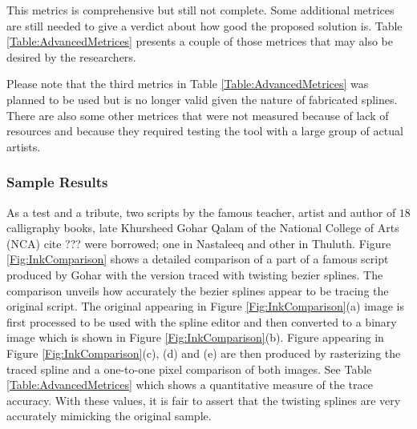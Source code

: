 This metrics is comprehensive but still not complete. Some additional metrices are still needed to give a verdict about how good the proposed solution is. Table \ref{Table:AdvancedMetrices} presents a couple of those metrices that may also be desired by the researchers.

\begin{table}[ht]
\centering
{}
\caption{Advanced metrices to gauge the effectiveness of twisting bezier splines.}
\label{Table:AdvancedMetrices}
\end{table}

Please note that the third metrics in Table \ref{Table:AdvancedMetrices} was planned to be used but is no longer valid given the nature of fabricated splines.
There are also some other metrices that were not measured because of lack of resources and because they required testing the tool with a large group of actual artists.

\subsubsection{Sample Results}
As a test and a tribute, two scripts by the famous teacher, artist and author of $18$ calligraphy books, late Khursheed Gohar Qalam of the National College of Arts (NCA) cite ??? were borrowed; one in Nastaleeq and other in Thuluth. Figure \ref{Fig:InkComparison} shows a detailed comparison of a part of a famous script produced by Gohar with the version traced with twisting bezier splines. The comparison unveils how accurately the bezier splines appear to be tracing the original script. The original appearing in Figure \ref{Fig:InkComparison}(a) image is first processed to be used with the spline editor and then converted to a binary image which is shown in Figure \ref{Fig:InkComparison}(b). Figure appearing in Figure \ref{Fig:InkComparison}(c), (d) and (e) are then produced by rasterizing the traced spline and a one-to-one pixel comparison of both images. See Table \ref{Table:AdvancedMetrices} which shows a quantitative measure of the trace accuracy. With these values, it is fair to assert that the twisting splines are very accurately mimicking the original sample.

